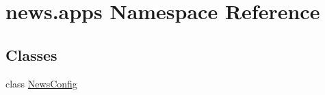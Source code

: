 \hypertarget{namespacenews_1_1apps}{}\section{news.\+apps Namespace Reference}
\label{namespacenews_1_1apps}
\subsection*{Classes}
\begin{DoxyCompactItemize}
\item 
class \mbox{\hyperlink{classnews_1_1apps_1_1_news_config}{News\+Config}}
\end{DoxyCompactItemize}

